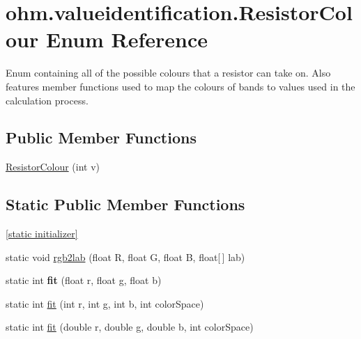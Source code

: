 \hypertarget{enumohm_1_1valueidentification_1_1_resistor_colour}{}\section{ohm.\+valueidentification.\+Resistor\+Colour Enum Reference}
\label{enumohm_1_1valueidentification_1_1_resistor_colour}


Enum containing all of the possible colours that a resistor can take on. Also features member functions used to map the colours of bands to values used in the calculation process.  


\subsection*{Public Member Functions}
\begin{DoxyCompactItemize}
\item 
\hyperlink{enumohm_1_1valueidentification_1_1_resistor_colour_a5828a5bf9478083a393751137153d659}{Resistor\+Colour} (int v)
\end{DoxyCompactItemize}
\subsection*{Static Public Member Functions}
\begin{DoxyCompactItemize}
\item 
\hyperlink{enumohm_1_1valueidentification_1_1_resistor_colour_ada1c80467eac208be473beadf83f968f}{\mbox{[}static initializer\mbox{]}}
\item 
static void \hyperlink{enumohm_1_1valueidentification_1_1_resistor_colour_a9c01747715aac184cde55a4161ccfe44}{rgb2lab} (float R, float G, float B, float\mbox{[}$\,$\mbox{]} lab)
\item 
\hypertarget{enumohm_1_1valueidentification_1_1_resistor_colour_a64c975f538d0040ef0ec5b2376a6ace7}{}\label{enumohm_1_1valueidentification_1_1_resistor_colour_a64c975f538d0040ef0ec5b2376a6ace7} 
static int {\bfseries fit} (float r, float g, float b)
\item 
static int \hyperlink{enumohm_1_1valueidentification_1_1_resistor_colour_a054bf549f7693e59f813f83d7b93148b}{fit} (int r, int g, int b, int color\+Space)
\item 
static int \hyperlink{enumohm_1_1valueidentification_1_1_resistor_colour_a04dc2256f1c7b0ffbe9edd9d85dd9fc6}{fit} (double r, double g, double b, int color\+Space)
\end{DoxyCompactItemize}
